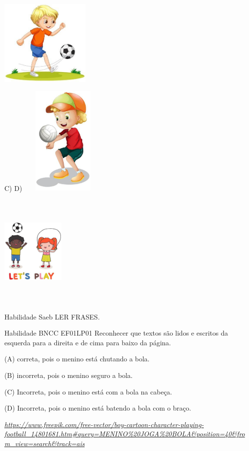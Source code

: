 \begin{escola}
\includegraphics[width=1.73760in,height=1.66822in]{media/image200.jpg}

C) D)
\includegraphics[width=1.65208in,height=2.13056in]{media/image201.jpg}

\includegraphics[width=1.21736in,height=2.20972in]{media/image202.jpg}

Habilidade Saeb LER FRASES.

Habilidade BNCC EF01LP01 Reconhecer que textos são lidos e escritos da
esquerda para a direita e de cima para baixo da página.

(A) correta, pois o menino está chutando a bola.

(B) incorreta, pois o menino seguro a bola.

(C) Incorreta, pois o menino está com a bola na cabeça.

(D) Incorreta, pois o menino está batendo a bola com o braço.

\href{https://www.freepik.com/free-vector/boy-cartoon-character-playing-football_14801681.htm\#query=MENINO\%20JOGA\%20BOLA\&position=40\&from_view=search\&track=ais}{\emph{https://www.freepik.com/free-vector/boy-cartoon-character-playing-football\_14801681.htm\#query=MENINO\%20JOGA\%20BOLA\&position=40\&from\_view=search\&track=ais}}


\end{escola}
